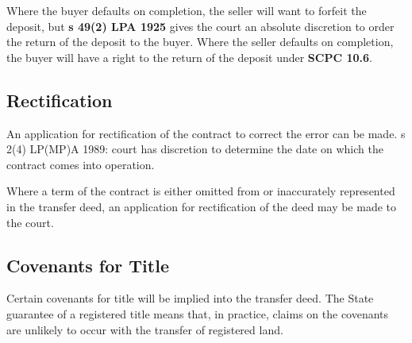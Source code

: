 \documentclass[
]{article}
\begin{document}
Where the buyer defaults on completion, the seller will want to forfeit
the deposit, but \textbf{s 49(2) LPA 1925} gives the court an absolute
discretion to order the return of the deposit to the buyer. Where the
seller defaults on completion, the buyer will have a right to the return
of the deposit under \textbf{SCPC 10.6}.

\hypertarget{rectification}{%
\subsection{Rectification}\label{rectification}}

An application for rectification of the contract to correct the error
can be made. s 2(4) LP(MP)A 1989: court has discretion to determine the
date on which the contract comes into operation.

Where a term of the contract is either omitted from or inaccurately
represented in the transfer deed, an application for rectification of
the deed may be made to the court.

\hypertarget{covenants-for-title}{%
\subsection{Covenants for Title}\label{covenants-for-title}}

Certain covenants for title will be implied into the transfer deed. The
State guarantee of a registered title means that, in practice, claims on
the covenants are unlikely to occur with the transfer of registered
land.
\end{document}
